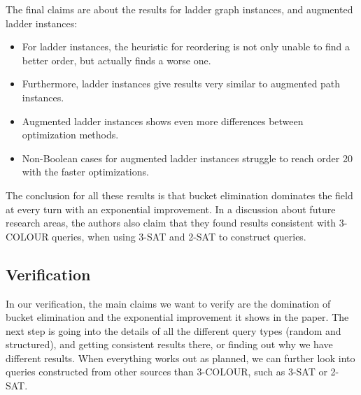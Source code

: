 \noindent The final claims are about the results for ladder graph instances, and augmented ladder instances:
\begin{itemize}
	\item For ladder instances, the heuristic for reordering is not only unable to find a better order, but actually finds a worse one.
	\item Furthermore, ladder instances give results very similar to augmented path instances.
	\item Augmented ladder instances shows even more differences between optimization methods.
	\item Non-Boolean cases for augmented ladder instances struggle to reach order 20 with the faster optimizations.
\end{itemize}

\noindent The conclusion for all these results is that bucket elimination dominates the field at every turn with an exponential improvement. In a discussion about future research areas, the authors also claim that they found results consistent with 3-COLOUR queries, when using 3-SAT and 2-SAT to construct queries.

\subsection{Verification}
In our verification, the main claims we want to verify are the domination of bucket elimination and the exponential improvement it shows in the paper. The next step is going into the details of all the different query types (random and structured), and getting consistent results there, or finding out why we have different results. When everything works out as planned, we can further look into queries constructed from other sources than 3-COLOUR, such as 3-SAT or 2-SAT.